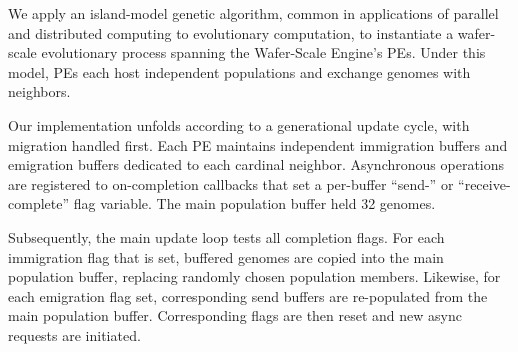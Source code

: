 

% 

We apply an island-model genetic algorithm, common in applications of parallel and distributed computing to evolutionary computation, to instantiate a wafer-scale evolutionary process spanning the Wafer-Scale Engine's PEs.
Under this model, PEs each host independent populations and exchange genomes with neighbors.

Our implementation unfolds according to a generational update cycle, with migration handled first.
Each PE maintains independent immigration buffers and emigration buffers dedicated to each cardinal neighbor.
Asynchronous operations are registered to on-completion callbacks that set a per-buffer ``send-'' or ``receive-complete'' flag variable.
The main population buffer held 32 genomes.

Subsequently, the main update loop tests all completion flags.
For each immigration flag that is set, buffered genomes are copied into the main population buffer, replacing randomly chosen population members.
Likewise, for each emigration flag set, corresponding send buffers are re-populated from the main population buffer.
Corresponding flags are then reset and new async requests are initiated.

